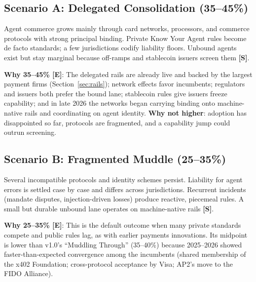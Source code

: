 \documentclass[11pt,letterpaper]{article}
\begin{document}
\subsection[Scenario A: Delegated Consolidation]{Scenario A: Delegated Consolidation (35--45\%)}

\begin{scenariobox}
Agent commerce grows mainly through card networks, processors, and commerce protocols with strong principal binding. Private Know Your Agent rules become de facto standards; a few jurisdictions codify liability floors. Unbound agents exist but stay marginal because off-ramps and stablecoin issuers screen them \textbf{[S]}.

\textbf{Why 35--45\% [E]}: The delegated rails are already live and backed by the largest payment firms (Section~\ref{sec:rails}); network effects favor incumbents; regulators and issuers both prefer the bound lane; stablecoin rules give issuers freeze capability; and in late 2026 the networks began carrying binding onto machine-native rails and coordinating on agent identity. \textbf{Why not higher}: adoption has disappointed so far, protocols are fragmented, and a capability jump could outrun screening.
\end{scenariobox}

\subsection[Scenario B: Fragmented Muddle]{Scenario B: Fragmented Muddle (25--35\%)}

\begin{scenariobox}
Several incompatible protocols and identity schemes persist. Liability for agent errors is settled case by case and differs across jurisdictions. Recurrent incidents (mandate disputes, injection-driven losses) produce reactive, piecemeal rules. A small but durable unbound lane operates on machine-native rails \textbf{[S]}.

\textbf{Why 25--35\% [E]}: This is the default outcome when many private standards compete and public rules lag, as with earlier payments innovations. Its midpoint is lower than v1.0's ``Muddling Through'' (35--40\%) because 2025--2026 showed faster-than-expected convergence among the incumbents (shared membership of the x402 Foundation; cross-protocol acceptance by Visa; AP2's move to the FIDO Alliance).
\end{scenariobox}
\end{document}
